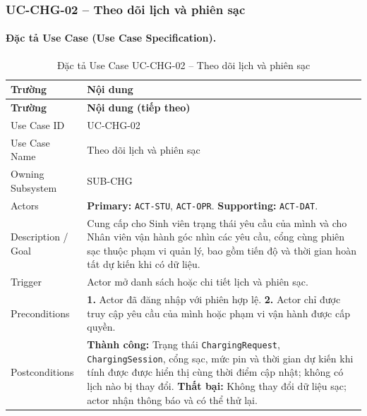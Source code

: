 \normalsize

\clearpage
\subsubsection{UC-CHG-02 -- Theo dõi lịch và phiên sạc}


\paragraph{Đặc tả Use Case (Use Case Specification).}
\small
\begin{longtable}{|L{42mm}|L{102mm}|}
  \caption{Đặc tả Use Case UC-CHG-02 -- Theo dõi lịch và phiên sạc}\label{tab:spec-UC-CHG-02}\\
  \hline
  \centering\arraybackslash\textbf{Trường} & \centering\arraybackslash\textbf{Nội dung}\\
  \hline
  \endfirsthead
  \hline
  \centering\arraybackslash\textbf{Trường} & \centering\arraybackslash\textbf{Nội dung (tiếp theo)}\\
  \hline
  \endhead
  Use Case ID & UC-CHG-02\\\hline
  Use Case Name & Theo dõi lịch và phiên sạc\\\hline
  Owning Subsystem & SUB-CHG\\\hline
  Actors & \textbf{Primary:} \texttt{ACT-STU}, \texttt{ACT-OPR}. \textbf{Supporting:} \texttt{ACT-DAT}.\\\hline
  Description / Goal & Cung cấp cho Sinh viên trạng thái yêu cầu của mình và cho Nhân viên vận hành góc nhìn các yêu cầu, cổng cùng phiên sạc thuộc phạm vi quản lý, bao gồm tiến độ và thời gian hoàn tất dự kiến khi có dữ liệu.\\\hline
  Trigger & Actor mở danh sách hoặc chi tiết lịch và phiên sạc.\\\hline
  Preconditions &
    \textbf{1.} Actor đã đăng nhập với phiên hợp lệ.\newline
    \textbf{2.} Actor chỉ được truy cập yêu cầu của mình hoặc phạm vi vận hành được cấp quyền.\\\hline
  Postconditions &
    \textbf{Thành công:} Trạng thái \texttt{ChargingRequest}, \texttt{ChargingSession}, cổng sạc, mức pin và thời gian dự kiến khi tính được được hiển thị cùng thời điểm cập nhật; không có lịch nào bị thay đổi.\newline
    \textbf{Thất bại:} Không thay đổi dữ liệu sạc; actor nhận thông báo và có thể thử lại.\\\hline

\end{longtable}
